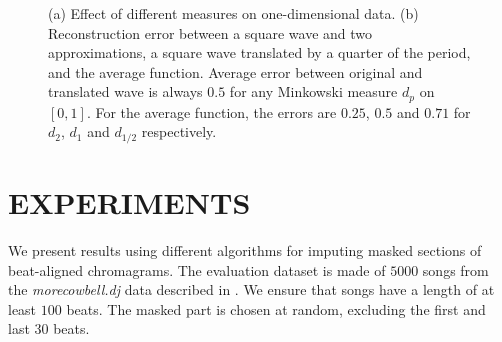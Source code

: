 \documentclass{article}
\begin{document}
\begin{figure}%
\centering
{} 
\hspace{0.1cm}
%
\hspace{8pt}%
\caption{(a) Effect of different measures on one-dimensional data. (b)
  Reconstruction error between a square wave and two approximations, a
  square wave translated by a quarter of the period, and the average
  function. Average error between original and translated wave is
  always $0.5$ for any Minkowski measure $d_p$ on $[0,1]$.  For the
  average function, the errors are $0.25$, $0.5$ and $0.71$ for $d_2$,
  $d_1$ and $d_{1/2}$ respectively.}%
\label{fig:two_measures}
\end{figure}


\section{EXPERIMENTS}
\label{sec:exp}
We present results using different algorithms for imputing masked
sections of beat-aligned chromagrams.  The evaluation dataset is made
of $5000$ songs from the \emph{morecowbell.dj} data described in
\cite{Bertin-Mahieux2010a}.  We ensure that songs have a length of at
least $100$ beats.  The masked part is chosen at random, excluding the
first and last $30$ beats.
\end{document}
